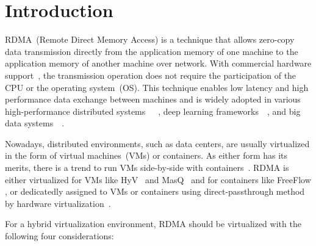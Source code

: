 \section{Introduction}
RDMA~(Remote Direct Memory Access) is a technique that allows zero-copy data transmission directly from the application memory of one machine to the application memory of another machine over network. With commercial hardware support~\cite{roce, iwarp, infiniband}, the transmission operation does not require the participation of the CPU or the operating system~(OS). This technique enables low latency and high performance data exchange between machines and is widely adopted in various high-performance distributed systems~\cite{dragojevic2014farm}~\cite{wei2015fast}~\cite{lu2017octopus}, deep learning frameworks~\cite{abadi2016tensorflow}~\cite{chen2015mxnet}, and big data systems~\cite{spark-rdma}~\cite{hadoop-rdma}.

Nowadays, distributed environments, such as data centers, are usually virtualized in the form of virtual machines~(VMs) or containers. As either form has its merits, there is a trend to run VMs side-by-side with containers~\cite{rethinkingvirtualization}. RDMA is either virtualized for VMs like HyV~\cite{pfefferle2015hybrid} and MasQ~\cite{he2020masq} and for containers like FreeFlow \cite{kim2019freeflow}, or dedicatedly assigned to VMs or containers using direct-passthrough method by hardware virtualization~\cite{sr-iov}.

For a hybrid virtualization environment, RDMA should be virtualized with the following four considerations: 

